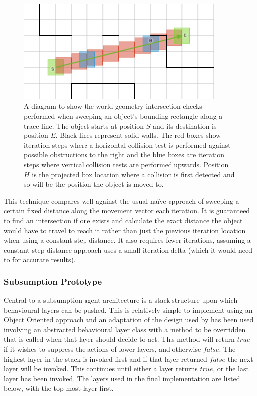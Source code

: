 \documentclass[a4paper,12pt]{article}
\begin{document}
\begin{figure}[h]
\centering
\includegraphics[width=0.9\textwidth]{trace}
\caption{A diagram to show the world geometry intersection checks performed when sweeping an object's bounding rectangle along a trace line. The object starts at position $S$ and its destination is position $E$. Black lines represent solid walls. The red boxes show iteration steps where a horizontal collision test is performed against possible obstructions to the right and the blue boxes are iteration steps where vertical collision tests are performed upwards. Position $H$ is the projected box location where a collision is first detected and so will be the position the object is moved to.}
\label{fig:trace}
\end{figure}

This technique compares well against the usual na\"{i}ve approach of sweeping a certain fixed distance along the movement vector each iteration. It is guaranteed to find an intersection if one exists and calculate the exact distance the object would have to travel to reach it rather than just the previous iteration location when using a constant step distance. It also requires fewer iterations, assuming a constant step distance approach uses a small iteration delta (which it would need to for accurate results).

\subsubsection{Subsumption Prototype}\noindent
Central to a subsumption agent architecture is a stack structure upon which behavioural layers can be pushed. This is relatively simple to implement using an Object Oriented approach and an adaptation of the design used by  \citeyear{butler01} has been used involving an abstracted behavioural layer class with a method to be overridden that is called when that layer should decide to act. This method will return $true$ if it wishes to suppress the actions of lower layers, and otherwise $false$. The highest layer in the stack is invoked first and if that layer returned $false$ the next layer will be invoked. This continues until either a layer returns $true$, or the last layer has been invoked. The layers used in the final implementation are listed below, with the top-most layer first.
\end{document}
